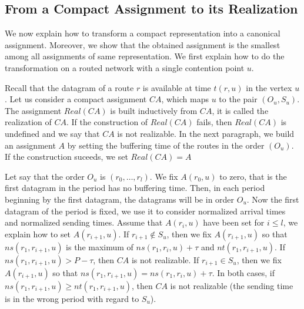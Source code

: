 \documentclass[english]{article}
\begin{document}
\subsection{From a Compact Assignment to its Realization}


We now explain how to transform a compact representation into a canonical assignment.
Moreover, we show that the obtained assignment is the smallest among all assignments of same representation. We first explain how to do the transformation on a routed network with a single contention point $u$.

Recall that the datagram of a route $r$ is available at time $t(r,u)$ in the vertex $u$.
Let us consider a compact assignment $CA$, which maps $u$ to the pair $(O_u,S_u)$.
The assignment $Real(CA)$ is built inductively from $CA$, it is called the realization of $CA$. 
If the construction of $Real(CA)$ fails, then $Real(CA)$ is undefined and we say that $CA$ is not realizable. In the next paragraph, we build an assignment $A$ by setting the buffering time of the routes in the order
 $(O_u)$. If the construction suceeds, we set $Real(CA) = A$ 

Let say that the order $O_u$ is $(r_0, \dots, r_l)$. We fix $A(r_0,u)$ to zero, that is the first
datagram in the period has no buffering time. Then, in each period beginning by the first datagram, the datagrams will be in order $O_u$. Now the first datagram of the period is fixed, we use it to consider normalized arrival times and normalized sending times.
Assume that $A(r_i,u)$ have been set for $i \leq l$, we explain how to 
set $A(r_{i+1},u)$. If $r_{i+1} \notin S_u$, then we fix $A(r_{i+1},u)$ so that $ns(r_1,r_{i+1},u)$ is the maximum of $ns(r_1,r_i,u) + \tau$ and $nt(r_1,r_{i+1},u)$. If $ns(r_1,r_{i+1},u) > P - \tau$, then $CA$ is not realizable. If $r_{i+1} \in S_u$, then we fix $A(r_{i+1},u)$ so that $ns(r_1, r_{i+1},u) = ns(r_1,r_i,u) + \tau$. In both cases, if $ns(r_1, r_{i+1},u) \geq nt(r_1,r_{i+1},u)$, then $CA$ is not realizable (the sending time is in the wrong period with regard to $S_u$). 
\end{document}

